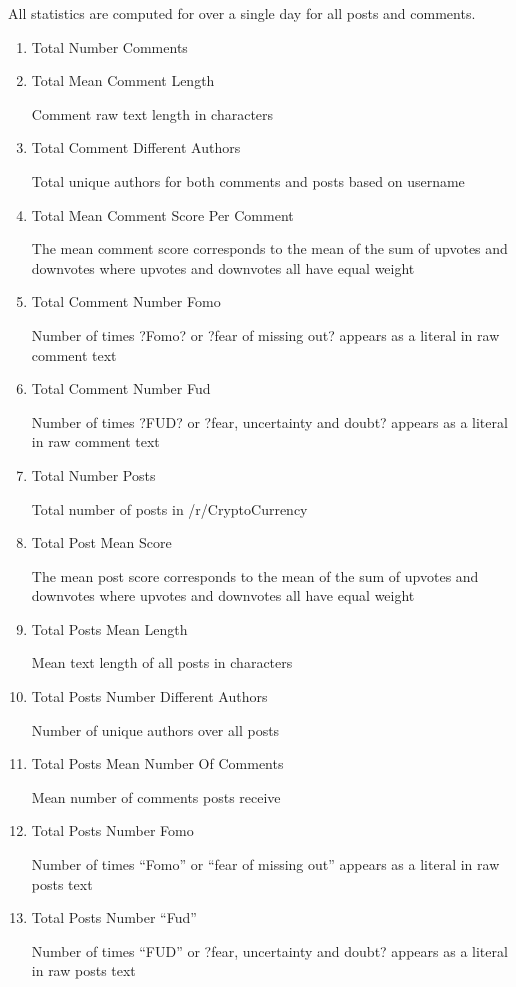 \documentclass[12pt]{article}
\begin{document}
 \indent All statistics are computed for over a single day for all posts and comments.
\begin{enumerate}
\item Total Number Comments
\item Total Mean Comment Length

\indent Comment raw text length in characters

\item Total Comment Different Authors

\indent Total unique authors for both comments and posts based on username

\item Total Mean Comment Score Per Comment

\indent The mean comment score corresponds to the mean of the sum of upvotes and downvotes where upvotes and downvotes all have equal weight

\item Total Comment Number Fomo

\indent Number of times ?Fomo? or ?fear of missing out? appears as a literal in raw comment text

\item Total Comment Number Fud

\indent Number of times ?FUD? or ?fear, uncertainty and doubt? appears as a literal in raw comment text

\item Total Number Posts

\indent Total number of posts in /r/CryptoCurrency	

\item Total Post Mean Score

\indent The mean post score corresponds to the mean of the sum of upvotes and downvotes where upvotes and downvotes all have equal weight

\item Total Posts Mean Length

\indent Mean text length of all posts in characters

\item Total Posts Number Different Authors

\indent Number of unique authors over all posts
	
\item Total Posts Mean Number Of Comments

\indent Mean number of comments posts receive 

\item Total Posts Number Fomo

\indent Number of times ``Fomo'' or ``fear of missing out'' appears as a literal in raw posts text

\item Total Posts Number ``Fud''

\indent Number of times ``FUD'' or ?fear, uncertainty and doubt? appears as a literal in raw posts text 
\end{enumerate}
\end{document}
